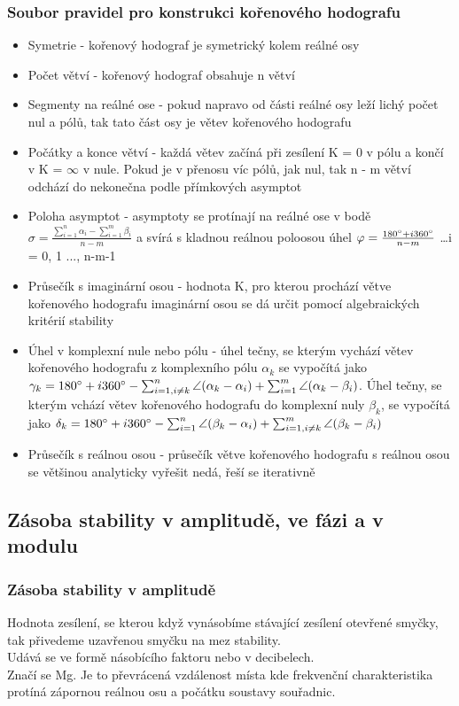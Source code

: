 \subsubsection*{Soubor pravidel pro konstrukci kořenového hodografu}
\begin{itemize}
    \item Symetrie - kořenový hodograf je symetrický kolem reálné osy
    \item Počet větví - kořenový hodograf obsahuje n větví
    \item Segmenty na reálné ose - pokud napravo od části reálné osy leží lichý počet nul a pólů, tak tato část osy je větev kořenového hodografu
    \item Počátky a konce větví - každá větev začíná při zesílení K = 0 v pólu a končí v K = $\infty$ v nule. Pokud je v přenosu víc pólů, jak nul, tak n - m větví odchází do nekonečna podle přímkových asymptot
    \item Poloha asymptot - asymptoty se protínají na reálné ose v bodě $\sigma = \frac{\sum^n_{i=1} \alpha_i - \sum^m_{i=1}\beta_i}{n-m}$ a svírá s kladnou reálnou poloosou úhel $\varphi = \frac{180 \degree + i360\degree}{n - m}$ \dots i = 0, 1 ..., n-m-1
    \item Průsečík s imaginární osou - hodnota K, pro kterou prochází větve kořenového hodografu imaginární osou se dá určit pomocí algebraických kritérií stability
    \item Úhel v komplexní nule nebo pólu - úhel tečny, se kterým vychází větev kořenového hodografu z komplexního pólu $\alpha_k$ se vypočítá jako $\gamma_k = 180 \degree + i360 \degree -\sum^n_{i=1, i\neq k}\angle(\alpha_k - \alpha_i) + \sum^m_{i=1}\angle(\alpha_k - \beta_i)$. Úhel tečny, se kterým vchází větev kořenového hodografu do komplexní nuly $\beta_k$, se vypočítá jako $\delta_k = 180 \degree + i360 \degree -\sum^n_{i=1}\angle(\beta_k - \alpha_i) + \sum^m_{i=1, i\neq k}\angle(\beta_k - \beta_i)$
    \item Průsečík s reálnou osou - průsečík větve kořenového hodografu s reálnou osou se většinou analyticky vyřešit nedá, řeší se iterativně
\end{itemize}
\subsection*{Zásoba stability v amplitudě, ve fázi a v modulu}
\subsubsection*{Zásoba stability v amplitudě}
Hodnota zesílení, se kterou když vynásobíme stávající zesílení otevřené smyčky, tak přivedeme uzavřenou smyčku na mez stability.\\
Udává se ve formě násobícího faktoru nebo v decibelech.\\
Značí se Mg. Je to převrácená vzdálenost místa kde frekvenční charakteristika protíná zápornou reálnou osu a počátku soustavy souřadnic.\\

